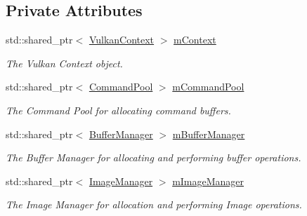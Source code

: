 \subsection*{Private Attributes}
\begin{DoxyCompactItemize}
\item 
\mbox{\label{class_render_system_a32bbfc62a23026279c8fd600e92687d5}} 
std\+::shared\+\_\+ptr$<$ \mbox{\hyperlink{class_vulkan_context}{Vulkan\+Context}} $>$ \mbox{\hyperlink{class_render_system_a32bbfc62a23026279c8fd600e92687d5}{m\+Context}}
\begin{DoxyCompactList}\small\item\em The Vulkan Context object. \end{DoxyCompactList}\item 
\mbox{\label{class_render_system_ada5e795a489d64db30d85bc918f7501d}} 
std\+::shared\+\_\+ptr$<$ \mbox{\hyperlink{class_command_pool}{Command\+Pool}} $>$ \mbox{\hyperlink{class_render_system_ada5e795a489d64db30d85bc918f7501d}{m\+Command\+Pool}}
\begin{DoxyCompactList}\small\item\em The Command Pool for allocating command buffers. \end{DoxyCompactList}\item 
\mbox{\label{class_render_system_a654ffa6fe467272a0a56105d117ed805}} 
std\+::shared\+\_\+ptr$<$ \mbox{\hyperlink{class_buffer_manager}{Buffer\+Manager}} $>$ \mbox{\hyperlink{class_render_system_a654ffa6fe467272a0a56105d117ed805}{m\+Buffer\+Manager}}
\begin{DoxyCompactList}\small\item\em The Buffer Manager for allocating and performing buffer operations. \end{DoxyCompactList}\item 
\mbox{\label{class_render_system_afd841a0361635ba888c663805a9d2458}} 
std\+::shared\+\_\+ptr$<$ \mbox{\hyperlink{class_image_manager}{Image\+Manager}} $>$ \mbox{\hyperlink{class_render_system_afd841a0361635ba888c663805a9d2458}{m\+Image\+Manager}}
\begin{DoxyCompactList}\small\item\em The Image Manager for allocation and performing Image operations. \end{DoxyCompactList}\item 

\end{DoxyCompactItemize}
